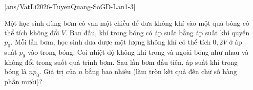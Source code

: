	\subsection*{}
	\setcounter{ex}{0}
	[ans/VatLi2026-TuyenQuang-SoGD-Lan1-3]

	\begin{ex}%
		Một học sinh dùng bơm có van một chiều để đưa không khí vào một quả bóng có thể tích không đổi $V$. Ban đầu, khí trong bóng có áp suất bằng áp suất khí quyển $p_0$. Mỗi lần bơm, học sinh đưa được một lượng không khí có thể tích $0{,}2V$ ở áp suất $p_0$ vào trong bóng. Coi nhiệt độ không khí trong và ngoài bóng như nhau và không đổi trong suốt quá trình bơm. Sau lần bơm đầu tiên, áp suất khí trong bóng là $np_0$. Giá trị của $n$ bằng bao nhiêu (làm tròn kết quả đến chữ số hàng phần mười)?
		\par
	\end{ex}

